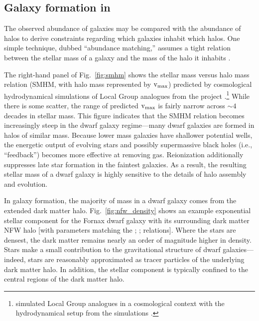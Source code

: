 \subsection{\texorpdfstring{Galaxy formation in
\LCDM{}}{Galaxy formation in }}\label{sec:galaxy_formation}

The observed abundance of galaxies may be compared with the abundance of
\LCDM{} halos to derive constraints regarding which galaxies inhabit
which halos. One simple technique, dubbed ``abundance matching,''
assumes a tight relation between the stellar mass of a galaxy and the
mass of the halo it inhabits
\citep{li+white2009, moster+naab+white2013}.

The right-hand panel of Fig.~\ref{fig:smhm} shows the stellar mass
versus halo mass relation (SMHM, with halo mass represented by
\({\rm v}_{\rm max}\)) predicted by \LCDM{} cosmological hydrodynamical simulations
of Local Group analogues from the \apostle{} project
\citep{sawala+2016}.\footnote{\apostle{} simulated Local Group analogues
  in a \LCDM{} cosmological context with the hydrodynamical setup from
  the \eagle{} simulations \citep{crain+2015, schaye+2015}.} While there
is some scatter, the range of predicted \({\rm v}_{\rm max}\) is fairly narrow
across \(\sim 4\) decades in stellar mass. This figure indicates that
the SMHM relation becomes increasingly steep in the dwarf galaxy
regime---many dwarf galaxies are formed in halos of similar mass.
Because lower mass galaxies have shallower potential wells, the
energetic output of evolving stars and possibly supermassive black holes
(i.e., ``feedback'') becomes more effective at removing gas.
Reionization additionally suppresses late star formation in the faintest
galaxies. As a result, the resulting stellar mass of a dwarf galaxy is
highly sensitive to the details of halo assembly and evolution.

In \LCDM{} galaxy formation, the majority of mass in a dwarf galaxy
comes from the extended dark matter halo. Fig.~\ref{fig:nfw_density}
shows an example exponential stellar component for the Fornax dwarf
galaxy with its surrounding dark matter NFW halo {[}with parameters
matching the \citet{ludlow+2016}; \citet{fattahi+2018}; relations{]}.
Where the stars are densest, the dark matter remains nearly an order of
magnitude higher in density. Stars make a small contribution to the
gravitational structure of dwarf galaxies---indeed, stars are reasonably
approximated as tracer particles of the underlying dark matter halo. In
addition, the stellar component is typically confined to the central
regions of the dark matter halo.

